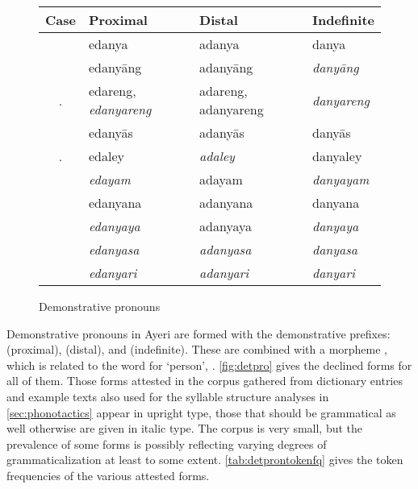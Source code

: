 \begin{figure}[tp]\centering
\caption{Demonstrative pronouns}

\begin{tabu} to .75\linewidth{S[2] X[4c] X[4c] X[4c]}
\tableheaderfont\toprule

Case
	& Proximal
	& Distal
	& Indefinite
	\\
\toprule

\Top{}
	& edanya
	& adanya
	& danya
	\\
	
\midrule
	
\Aarg{}
	& edanyāng
	& adanyāng
	& \emph{danyāng}
	\\

\Aarg{}.\Inan{}
	& edareng, \emph{edanyareng}
	& adareng, adanyareng
	& \emph{danyareng}
	\\
	
\Parg{}
	& edanyās
	& adanyās
	& danyās
	\\

\Parg{}.\Inan{}
	& edaley
	& \emph{adaley}
	& danyaley
	\\

\Dat{}
	& \emph{edayam}
	& adayam
	& \emph{danyayam}
	\\

\midrule

\Gen{}
	& edanyana
	& adanyana
	& danyana
	\\
	
\Loc{}
	& \emph{edanyaya}
	& adanyaya
	& \emph{danyaya}
	\\
	
\Caus{}
	& \emph{edanyasa}
	& \emph{adanyasa}
	& \emph{danyasa}
	\\
	
\Ins{}
	& \emph{edanyari}
	& \emph{adanyari}
	& \emph{danyari}
	\\

\bottomrule
\end{tabu}
\label{fig:detpro}
\end{figure}

Demonstrative pronouns in Ayeri are formed with the demonstrative 
prefixes:  (proximal),  
(distal), and  (indefinite). These are combined with a 
morpheme , which is related to the word for `person', 
. \autoref{fig:detpro} gives the declined forms for all of 
them. Those forms attested in the corpus gathered from dictionary entries and 
example texts also used for the syllable structure analyses in 
\autoref{sec:phonotactics} appear in upright type, those that should be 
grammatical as well otherwise are given in italic type. The corpus is very 
small, but the prevalence of some forms is possibly reflecting varying degrees 
of grammaticalization at least to some extent. \autoref{tab:detprontokenfq} 
gives the token frequencies of the various attested forms.

